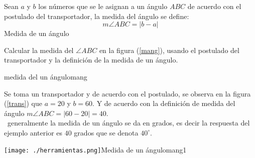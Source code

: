 \begin{definicion}{Sean $a$ y $b$ los números que se le asignan a un ángulo
$ABC$ de acuerdo con el postulado
 del transportador, la medida del ángulo se define:
\[ m \angle{ABC}=|b-a|\]}{Medida de un ángulo}

\end{definicion}

\begin{ejemplo}{Calcular la medida del $\angle {ABC}$ en la figura (\ref{mang}), usando el postulado del transportador
y la definición de la medida de un ángulo. }
\begin{figura}{
}{medida del un ángulo}{mang}
\end{figura}
\end{ejemplo}
\solucion
Se toma un transportador y de acuerdo con el postulado, se observa  en la figura (\ref{trans}) que $a=20$
y $b=60$. Y de acuerdo con la definición de medida del ángulo $m\angle{ABC}=|60-20|=40$.\\

\nota\, generalmente la medida de un ángulo se da en grados, es decir la res\-puesta del ejemplo anterior es
$40$ grados que se denota $40^\circ$.
\begin{figura}{ \texttt{[image: ./herramientas.png]}}{Medida de un ángulo}{mang1}
\end{figura}

